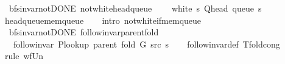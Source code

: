 \begin{isabellebody}
\endisatagproof
{\isafoldproof}%
%
\isadelimproof
\isanewline
%
\endisadelimproof
%
\isadeliminvisible
\isanewline
%
\endisadeliminvisible
%
\isataginvisible
{}\isamarkupfalse%
\ {\isacharparenleft}{\kern0pt}\ bfs{\isacharunderscore}{\kern0pt}invar{\isacharunderscore}{\kern0pt}not{\isacharunderscore}{\kern0pt}DONE{\isacharparenright}{\kern0pt}\ not{\isacharunderscore}{\kern0pt}white{\isacharunderscore}{\kern0pt}head{\isacharunderscore}{\kern0pt}queue{\isacharcolon}{\kern0pt}\isanewline
\ \ \ {\isachardoublequoteopen}{\isasymnot}\ white\ s\ {\isacharparenleft}{\kern0pt}Q{\isacharunderscore}{\kern0pt}head\ {\isacharparenleft}{\kern0pt}queue\ s{\isacharparenright}{\kern0pt}{\isacharparenright}{\kern0pt}{\isachardoublequoteclose}%
\endisataginvisible
{\isafoldinvisible}%
%
\isadeliminvisible
\isanewline
%
\endisadeliminvisible
%
\isadelimproof
\ \ %
\endisadelimproof
%
\isatagproof
{}\isamarkupfalse%
\ head{\isacharunderscore}{\kern0pt}queue{\isacharunderscore}{\kern0pt}mem{\isacharunderscore}{\kern0pt}queue\isanewline
\ \ \isamarkupfalse%
\ {\isacharparenleft}{\kern0pt}intro\ not{\isacharunderscore}{\kern0pt}white{\isacharunderscore}{\kern0pt}if{\isacharunderscore}{\kern0pt}mem{\isacharunderscore}{\kern0pt}queue{\isacharparenright}{\kern0pt}%
\endisatagproof
{\isafoldproof}%
%
\isadelimproof
\isanewline
%
\endisadelimproof
\isanewline
{}\isamarkupfalse%
\ {\isacharparenleft}{\kern0pt}\ bfs{\isacharunderscore}{\kern0pt}invar{\isacharunderscore}{\kern0pt}not{\isacharunderscore}{\kern0pt}DONE{\isacharparenright}{\kern0pt}\ follow{\isacharunderscore}{\kern0pt}invar{\isacharunderscore}{\kern0pt}parent{\isacharunderscore}{\kern0pt}fold{\isacharcolon}{\kern0pt}\isanewline
\ \ \ {\isachardoublequoteopen}follow{\isacharunderscore}{\kern0pt}invar\ {\isacharparenleft}{\kern0pt}P{\isacharunderscore}{\kern0pt}lookup\ {\isacharparenleft}{\kern0pt}parent\ {\isacharparenleft}{\kern0pt}fold\ G\ src\ s{\isacharparenright}{\kern0pt}{\isacharparenright}{\kern0pt}{\isacharparenright}{\kern0pt}{\isachardoublequoteclose}\isanewline
%
\isadelimproof
\ \ %
\endisadelimproof
%
\isatagproof
{}\isamarkupfalse%
\ follow{\isacharunderscore}{\kern0pt}invar{\isacharunderscore}{\kern0pt}def\ T{\isacharunderscore}{\kern0pt}fold{\isacharunderscore}{\kern0pt}cong\isanewline
{}\isamarkupfalse%
\ {\isacharparenleft}{\kern0pt}rule\ wf{\isacharunderscore}{\kern0pt}Un{\isacharparenright}{\kern0pt}\isanewline
\ \ \isamarkupfalse%

\end{isabellebody}
